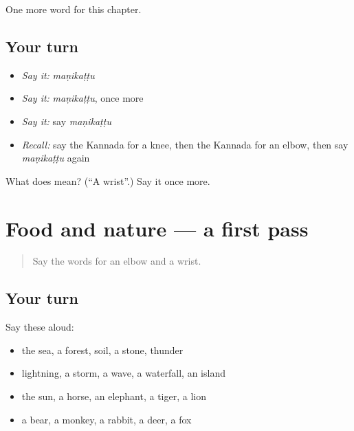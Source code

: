 \begin{grammarlens}[title={What you've built}]
One more word for this chapter.
\end{grammarlens}

\subsection*{Your turn}
\begin{itemize}
\raggedright
  \item \emph{Say it:} \emph{maṇikaṭṭu}
  \item \emph{Say it:} \emph{maṇikaṭṭu}, once more
  \item \emph{Say it:} say \emph{maṇikaṭṭu}
  \item \emph{Recall:} say the Kannada for a knee, then the Kannada for an elbow, then say \emph{maṇikaṭṭu} again
\end{itemize}

\begin{tcolorbox}[breakable,colback=teal!4,colframe=teal!35!black,title={Before you move on}]
What does  mean? (\textquotedblleft{}A wrist\textquotedblright{}.) Say it once more.
\end{tcolorbox}
\section[(dialogue)]{Food and nature — a first pass}

\label{lesson:KA-R135-first-pass-food-and-nature}



\begin{quote}
Say the words for an elbow and a wrist.
\end{quote}

\subsection*{Your turn}
Say these aloud:

\begin{itemize}
\raggedright
  \item the sea, a forest, soil, a stone, thunder
  \item lightning, a storm, a wave, a waterfall, an island
  \item the sun, a horse, an elephant, a tiger, a lion
  \item a bear, a monkey, a rabbit, a deer, a fox
\end{itemize}

